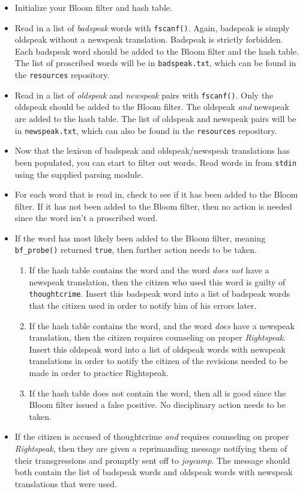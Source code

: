 \documentclass{article}
\begin{document}
\begin{itemize}
  \item Initialize your Bloom filter and hash table.
  \item Read in a list of \emph{badspeak} words with \texttt{fscanf()}.
    Again, badspeak is simply oldspeak without a newspeak translation.
    Badspeak is strictly forbidden. Each badspeak word should be added
    to the Bloom filter and the hash table. The list of proscribed words
    will be in \texttt{badspeak.txt}, which can be found in the
    \texttt{resources} repository.
  \item Read in a list of \emph{oldspeak} and \emph{newspeak} pairs with
    \texttt{fscanf()}. Only the oldspeak should be added to the Bloom
    filter. The oldspeak \emph{and} newspeak are added to the hash
    table. The list of oldspeak and newspeak pairs will be in
    \texttt{newspeak.txt}, which can also be found in the
    \texttt{resources} repository.
  \item Now that the lexicon of badspeak and oldspeak/newspeak
    translations has been populated, you can start to filter out words.
    Read words in from \texttt{stdin} using the supplied parsing module.
  \item For each word that is read in, check to see if it has been added
    to the Bloom filter. If it has not been added to the Bloom filter,
    then no action is needed since the word isn't a proscribed word.
  \item If the word has most likely been added to the Bloom filter,
    meaning \texttt{bf\_probe()} returned \texttt{true}, then further
    action needs to be taken.
    \begin{enumerate}
      \item If the hash table contains the word and the word \emph{does
        not} have a newspeak translation, then the citizen who used this
        word is guilty of \texttt{thoughtcrime}. Insert this badspeak
        word into a list of badspeak words that the citizen used in
        order to notify him of his errors later.
      \item If the hash table contains the word, and the word \emph{does}
        have a newspeak translation, then the citizen requires
        counseling on proper \emph{Rightspeak}. Insert this oldspeak
        word into a list of oldspeak words with newspeak translations in
        order to notify the citizen of the revisions needed to be made
        in order to practice Rightspeak.
      \item If the hash table does not contain the word, then all is
        good since the Bloom filter issued a false positive. No
        disciplinary action needs to be taken.
    \end{enumerate}
  \item If the citizen is accused of thoughtcrime \emph{and} requires
    counseling on proper \emph{Rightspeak}, then they are given a
    reprimanding message notifying them of their transgressions and
    promptly sent off to \emph{joycamp}. The message should both contain
    the list of badspeak words and oldspeak words with newspeak
    translations that were used.


\end{itemize}
\end{document}
